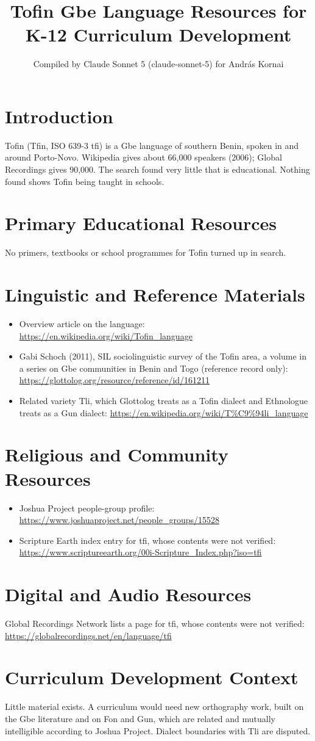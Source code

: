 \documentclass[12pt]{article}
\title{Tofin Gbe Language Resources for K-12 Curriculum Development}
\author{Compiled by Claude Sonnet 5 (claude-sonnet-5) for Andr\'as Kornai}
\date{}
\begin{document}
\maketitle
\section{Introduction}
Tofin (T\textopenbullet fin, ISO 639-3 tfi) is a Gbe language of southern Benin, spoken in and around Porto-Novo. Wikipedia gives about 66,000 speakers (2006); Global Recordings gives 90,000. The search found very little that is educational. Nothing found shows Tofin being taught in schools.
\section{Primary Educational Resources}
No primers, textbooks or school programmes for Tofin turned up in search.
\section{Linguistic and Reference Materials}
\begin{itemize}
\item Overview article on the language: \url{https://en.wikipedia.org/wiki/Tofin_language}
\item Gabi Schoch (2011), SIL sociolinguistic survey of the Tofin area, a volume in a series on Gbe communities in Benin and Togo (reference record only): \url{https://glottolog.org/resource/reference/id/161211}
\item Related variety T\textopenbullet li, which Glottolog treats as a Tofin dialect and Ethnologue treats as a Gun dialect: \url{https://en.wikipedia.org/wiki/T%C9%94li_language}
\end{itemize}
\section{Religious and Community Resources}
\begin{itemize}
\item Joshua Project people-group profile: \url{https://www.joshuaproject.net/people_groups/15528}
\item Scripture Earth index entry for tfi, whose contents were not verified: \url{https://www.scriptureearth.org/00i-Scripture_Index.php?iso=tfi}
\end{itemize}
\section{Digital and Audio Resources}
Global Recordings Network lists a page for tfi, whose contents were not verified: \url{https://globalrecordings.net/en/language/tfi}
\section{Curriculum Development Context}
Little material exists. A curriculum would need new orthography work, built on the Gbe literature and on Fon and Gun, which are related and mutually intelligible according to Joshua Project. Dialect boundaries with T\textopenbullet li are disputed.
\end{document}
